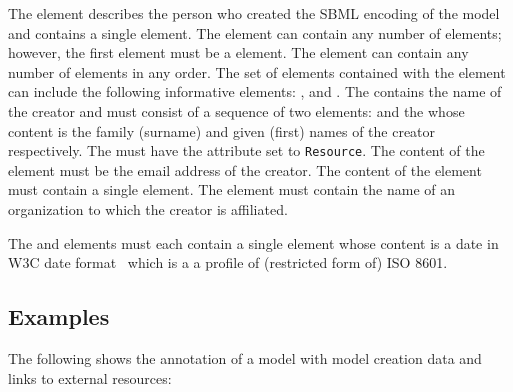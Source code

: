 The  element describes the person who created
the SBML encoding of the model and contains a single
 element.  The  element can contain
any number of elements; however, the first element must be a
 element.  The  element can contain
any number of elements in any order.  The set of elements
contained with the  element can include the
following informative elements: ,
 and .  The 
contains the name of the creator and must consist of a sequence of
two elements:  and the 
whose content is the family (surname) and given (first) names of
the creator respectively.  The  must have the
attribute  set to \texttt{Resource}.  The
content of the  element must be the email
address of the creator.  The content of the 
element must contain a single  element.  The
 element must contain the name of an
organization to which the creator is affiliated.

The  and  elements
must each contain a single  element whose
content is a date in W3C date format~\citep{wolf:1998} which is a
a profile of (restricted form of) ISO 8601.


\subsection{Examples}

The following shows the annotation of a model with model creation
data and links to external resources:

